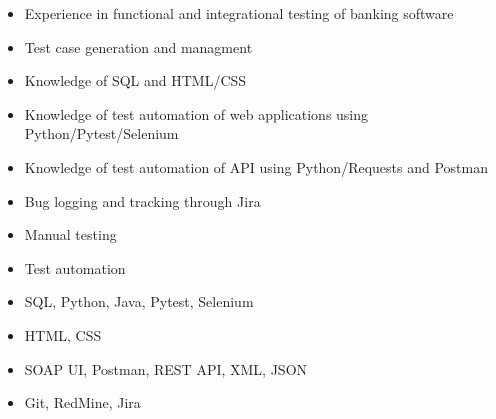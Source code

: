 \documentclass[10pt]{developercv} %
\begin{document}
\begin{minipage}[t]{0.6\textwidth}
	\vspace{-\baselineskip}
	\begin{itemize}
		\setlength\itemsep{0pt}
		\setlength\itemindent{-\baselineskip}
		\item{Experience in functional and integrational testing of banking software}
		\item{Test case generation and managment}
		\item{Knowledge of SQL and HTML/CSS}
		\item{Knowledge of test automation of web applications using Python/Pytest/Selenium}
		\item{Knowledge of test automation of API using Python/Requests and Postman}
		\item{Bug logging and tracking through Jira}

	\end{itemize}
\end{minipage}
\hfill %
\begin{minipage}[t]{0.35\textwidth}
	\vspace{-\baselineskip}
	\begin{itemize}
		\setlength\itemsep{0pt}
		\setlength\itemindent{-\baselineskip}
		\item{Manual testing}
		\item{Test automation}
		\item{SQL, Python, Java, Pytest, Selenium}
		\item{HTML, CSS}
		\item{SOAP UI, Postman, REST API, XML, JSON}
		\item{Git, RedMine, Jira}
	\end{itemize}
\end{minipage}



\end{document}
